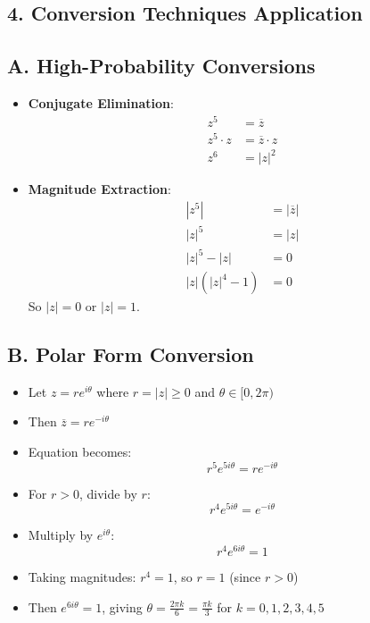 \documentclass[11pt]{article}
\begin{document}
\begin{conversionbox}
\section*{4. Conversion Techniques Application}

\subsection*{A. High-Probability Conversions}
\begin{itemize}[leftmargin=*]
    \item \textbf{Conjugate Elimination}: 
    \begin{align*}
    z^5 &= \overline{z}\\
    z^5 \cdot z &= \overline{z} \cdot z\\
    z^6 &= |z|^2
    \end{align*}
    \item \textbf{Magnitude Extraction}:
    \begin{align*}
    |z^5| &= |\overline{z}|\\
    |z|^5 &= |z|\\
    |z|^5 - |z| &= 0\\
    |z|(|z|^4 - 1) &= 0
    \end{align*}
    So $|z| = 0$ or $|z| = 1$.
\end{itemize}

\subsection*{B. Polar Form Conversion}
\begin{itemize}[leftmargin=*]
    \item Let $z = re^{i\theta}$ where $r = |z| \geq 0$ and $\theta \in [0, 2\pi)$
    \item Then $\overline{z} = re^{-i\theta}$
    \item Equation becomes:
    \[r^5 e^{5i\theta} = re^{-i\theta}\]
    \item For $r > 0$, divide by $r$:
    \[r^4 e^{5i\theta} = e^{-i\theta}\]
    \item Multiply by $e^{i\theta}$:
    \[r^4 e^{6i\theta} = 1\]
    \item Taking magnitudes: $r^4 = 1$, so $r = 1$ (since $r > 0$)
    \item Then $e^{6i\theta} = 1$, giving $\theta = \frac{2\pi k}{6} = \frac{\pi k}{3}$ for $k = 0, 1, 2, 3, 4, 5$
\end{itemize}


\end{conversionbox}
\end{document}
